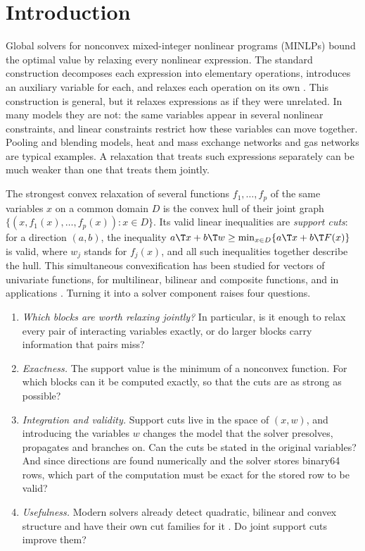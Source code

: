 \section{Introduction}\label{sec:introduction}

Global solvers for nonconvex mixed-integer nonlinear programs (MINLPs) bound
the optimal value by relaxing every nonlinear expression. The standard
construction decomposes each expression into elementary operations,
introduces an auxiliary variable for each, and relaxes each operation on its
own \citep{McCormick1976,SmithPantelides1999,TawarmalaniSahinidis2004}. This
construction is general, but it relaxes expressions as if they were
unrelated. In many models they are not: the same variables appear in several
nonlinear constraints, and linear constraints restrict how these variables
can move together. Pooling and blending models, heat and mass exchange
networks and gas networks are typical examples. A relaxation that treats such
expressions separately can be much weaker than one that treats them jointly.

The strongest convex relaxation of several functions $f_1,\dots,f_p$ of the
same variables $x$ on a common domain $D$ is the convex hull of their joint
graph $\{(x,f_1(x),\dots,f_p(x)):x\in D\}$. Its valid linear inequalities are
\emph{support cuts}: for a direction $(a,b)$, the inequality
$a\T x+b\T w\ge\min_{x\in D}\{a\T x+b\T F(x)\}$ is valid, where $w_j$ stands for
$f_j(x)$, and all such inequalities together describe the hull. This
simultaneous convexification has been studied for vectors of univariate
functions, for multilinear, bilinear and composite functions, and in
applications \citep{Tawarmalani2010,Ballerstein2013,LiersEtAl2021,DavarniaRichardTawarmalani2017,HeTawarmalani2021,ZhuHeTawarmalani2026}.
Turning it into a solver component raises four questions.
\begin{enumerate}[label=(\arabic*)]
\item \emph{Which blocks are worth relaxing jointly?} In particular, is it
enough to relax every pair of interacting variables exactly, or do larger
blocks carry information that pairs miss?
\item \emph{Exactness.} The support value is the minimum of a nonconvex
function. For which blocks can it be computed exactly, so that the cuts are
as strong as possible?
\item \emph{Integration and validity.} Support cuts live in the space of
$(x,w)$, and introducing the variables $w$ changes the model that the solver
presolves, propagates and branches on. Can the cuts be stated in the original
variables? And since directions are found numerically and the solver stores
binary64 rows, which part of the computation must be exact for the stored row
to be valid?
\item \emph{Usefulness.} Modern solvers already detect quadratic, bilinear and
convex structure and have their own cut families for it
\citep{BestuzhevaEtAl2025}. Do joint support cuts improve them?
\end{enumerate}

